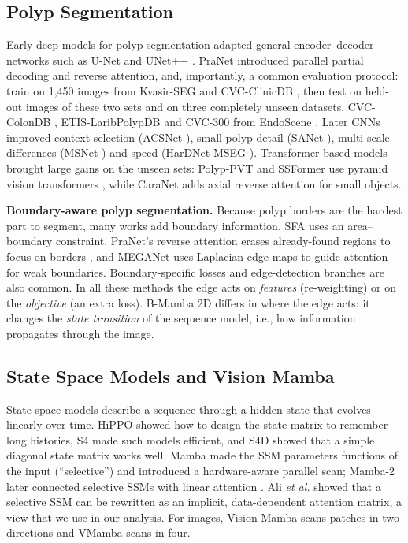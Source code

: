\documentclass[journal]{IEEEtran}
\begin{document}
\subsection{Polyp Segmentation}
Early deep models for polyp segmentation adapted general encoder--decoder networks such as U-Net \cite{ronneberger2015unet} and UNet++ \cite{zhou2018unetpp}. PraNet \cite{fan2020pranet} introduced parallel partial decoding and reverse attention, and, importantly, a common evaluation protocol: train on 1,450 images from Kvasir-SEG \cite{jha2020kvasir} and CVC-ClinicDB \cite{bernal2015clinicdb}, then test on held-out images of these two sets and on three completely unseen datasets, CVC-ColonDB \cite{tajbakhsh2016colondb}, ETIS-LaribPolypDB \cite{silva2014etis} and CVC-300 from EndoScene \cite{vazquez2017endoscene}. Later CNNs improved context selection (ACSNet \cite{zhang2020acsnet}), small-polyp detail (SANet \cite{wei2021sanet}), multi-scale differences (MSNet \cite{zhao2021msnet}) and speed (HarDNet-MSEG \cite{huang2021hardnet}). Transformer-based models brought large gains on the unseen sets: Polyp-PVT \cite{dong2023polyppvt} and SSFormer \cite{wang2022ssformer} use pyramid vision transformers \cite{wang2021pvt}, while CaraNet \cite{lou2022caranet} adds axial reverse attention for small objects.

\textbf{Boundary-aware polyp segmentation.} Because polyp borders are the hardest part to segment, many works add boundary information. SFA \cite{fang2019sfa} uses an area--boundary constraint, PraNet's reverse attention erases already-found regions to focus on borders \cite{fan2020pranet}, and MEGANet \cite{bui2024meganet} uses Laplacian edge maps to guide attention for weak boundaries. Boundary-specific losses \cite{kervadec2021boundary} and edge-detection branches \cite{xie2015hed} are also common. In all these methods the edge acts on \emph{features} (re-weighting) or on the \emph{objective} (an extra loss). B-Mamba 2D differs in where the edge acts: it changes the \emph{state transition} of the sequence model, i.e., how information propagates through the image.

\subsection{State Space Models and Vision Mamba}
State space models describe a sequence through a hidden state that evolves linearly over time. HiPPO \cite{gu2020hippo} showed how to design the state matrix to remember long histories, S4 \cite{gu2022s4} made such models efficient, and S4D \cite{gu2022s4d} showed that a simple diagonal state matrix works well. Mamba \cite{gu2023mamba} made the SSM parameters functions of the input (``selective'') and introduced a hardware-aware parallel scan; Mamba-2 \cite{dao2024mamba2} later connected selective SSMs with linear attention \cite{katharopoulos2020linear}. Ali \emph{et al.} \cite{ali2024hidden} showed that a selective SSM can be rewritten as an implicit, data-dependent attention matrix, a view that we use in our analysis. For images, Vision Mamba \cite{zhu2024vim} scans patches in two directions and VMamba \cite{liu2024vmamba} scans in four.
\end{document}
